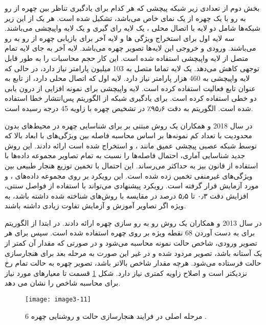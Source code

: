 \noindent
بخش دوم از تعدادی زیر شبکه پیچشی که هر کدام برای یادگیری تناظر بین چهره از رو به رو با یک چهره از یک نمای خاص می‌باشد، تشکیل شده است. هر یک از این زیر شبکه‌ها شامل دو لایه با اتصال محلی ، یک لایه رای گیری و یک لایه واپیچشی می‌باشند. سه لایه اول برای استخراج ویژگی ها و لایه آخر برای بازیابی چهره از رو به رو می‌باشند. ورودی و خروجی این لایه‌ها تصویر چهره می‌باشد. لایه آخر به جای لایه تمام متصل از لایه واپیچشی استفاده شده است. این کار حجم محاسبات را به طور قابل توجهی کاهش می‌دهد. یک لایه تماما متصل به 103 میلیون پارامتر نیاز دارد، در حالی که لایه واپیچشی به 460 هزار پارامتر نیاز دارد. لایه اول که اتصال محلی دارد، از تابع  به عنوان تابع فعالیت استفاده کرده است. لایه واپیچشی برای نمونه افزایی از درون یابی دو خطی استفاده کرده است. برای یادگیری شبکه از الگوریتم پس‌انتشار خطا  استفاده شده است. الگوریتم  به دقت ۹۵٫۶٪ در تشخیص چهره با زاویه 45 درجه رسیده است.

\noindent
در سال 2018  و همکاران \cite{SAVCHENKO2018170} یک روش مبتنی بر   برای شناسایی چهره در محیط‌های بدون محدودیت با تعداد کم نمونه‌ها بر اساس محاسبه فاصله بین ویژگی‌های با ابعاد بالا که توسط شبکه عصبی پیچشی عمیق مانند ،  و  استخراج شده است ارائه دادند. این روش جدید شناسایی آماری، احتمال فاصله‌ها را نسبت به تمام تصاویر مجموعه داده‌ها با استفاده از قانون بیز به حداکثر می‌رساند. این احتمال با تخمین توزیع هنجار طبیعی  بین ویژگی‌های غیرمنفی تخمین زده شده است. این رویکرد بر روی مجموعه داده‌های ،  و  مورد آزمایش قرار گرفته است. رویکرد پیشنهادی می‌تواند با استفاده از فواصل سنتی، افزایش دقت ۰٫۳ تا ۵٫۵ درصد در مقایسه با روش‌های شناخته شده داشته باشد، به ویژه اگر تصاویر آموزش و آزمایش تفاوت زیادی داشته باشند.

\noindent
در سال 2013  و همکاران \cite{6196234} یک روش رو به رو سازی چهره ارائه دادند. در ابتدا از الگوریتم   برای به دست آوردن 68 نقطه ویژه بر روی چهره استفاده شده است. سپس برای هر تصویر ورودی، شاخص حالت نمونه   محاسبه می‌شود و در صورتی که مقدار آن کمتر از یک آستانه باشد، تصویر مردود شده و در غیر این صورت به مرحله بعد برای هنجارسازی حالت فرستاده می‌شود. هرچه مقدار شاخص  بالاتر باشد، تصویر چهره به حالت تمام رخ نزدیکتر است و اصلاح زاویه کمتری نیاز دارد. شکل \ref{image3-11} قسمت  تا  معیارهای مورد نیاز برای محاسبه شاخص  را نشان می دهد.

\begin{figure}[h]
\centering
  \texttt{[image: image3-11]}
  \caption{6 مرحله اصلی در فرایند هنجارسازی حالت و روشنایی چهره \cite{6196234}.}
  \label{image3-11}
\end{figure}

